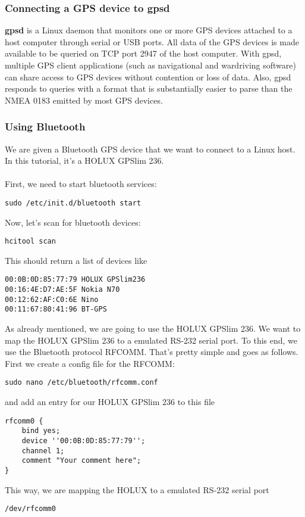 \subsubsection{Connecting a GPS device to gpsd}
\textbf{gpsd} is a Linux daemon that monitors one or more GPS devices attached to a host computer through serial or USB ports. All data of the GPS devices is made available to be queried on TCP port 2947 of the host computer. With gpsd, multiple GPS client applications (such as navigational and wardriving software) can share access to GPS devices without contention or loss of data. Also, gpsd responds to queries with a format that is substantially easier to parse than the NMEA 0183 emitted by most GPS devices.

\subsubsection{Using Bluetooth}
We are given a Bluetooth GPS device that we want to connect to a Linux host. In this tutorial, it's a HOLUX GPSlim 236.\\
\\
First, we need to start bluetooth services:
\begin{verbatim}
sudo /etc/init.d/bluetooth start
\end{verbatim}
Now, let's scan for bluetooth devices:
\begin{verbatim}
hcitool scan
\end{verbatim}
This should return a list of devices like
\begin{verbatim}
00:0B:0D:85:77:79 HOLUX GPSlim236
00:16:4E:D7:AE:5F Nokia N70
00:12:62:AF:C0:6E Nino
00:11:67:80:41:96 BT-GPS
\end{verbatim}
As already mentioned, we are going to use the HOLUX GPSlim 236. We want to map the HOLUX GPSlim 236 to a emulated RS-232 serial port. To this end, we use the Bluetooth protocol RFCOMM. That's pretty simple and goes as follows. First we create a config file for the RFCOMM:
\begin{verbatim}
sudo nano /etc/bluetooth/rfcomm.conf
\end{verbatim}
and add an entry for our HOLUX GPSlim 236 to this file
\begin{verbatim}
rfcomm0 {
	bind yes;
	device ''00:0B:0D:85:77:79'';
	channel 1;
	comment "Your comment here";
}
\end{verbatim}
This way, we are mapping the HOLUX to a emulated RS-232 serial port
\begin{verbatim}
/dev/rfcomm0
\end{verbatim}
